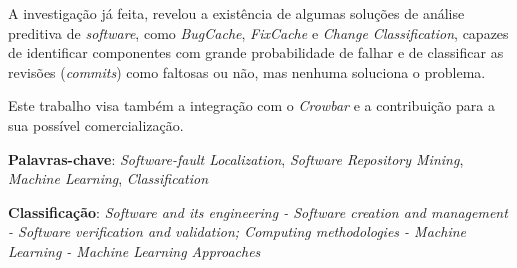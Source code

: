 A investigação já feita, revelou a existência de algumas soluções de análise preditiva de \emph{software}, como \emph{BugCache}, \emph{FixCache} e \emph{Change Classification}, capazes de identificar componentes com grande probabilidade de falhar e de classificar as revisões (\emph{commits}) como faltosas ou não, mas nenhuma soluciona o problema.

Este trabalho visa também a integração com o \emph{Crowbar} e a contribuição para a sua possível comercialização.

\vspace*{10mm}\noindent

\textbf{Palavras-chave}: \emph{Software-fault Localization}, \emph{Software Repository Mining}, \emph{Machine Learning}, \emph{Classification}

\vspace*{5mm}\noindent

\textbf{Classificação}: \emph{Software and its engineering - Software creation and management - Software verification and validation; Computing methodologies - Machine Learning - Machine Learning Approaches}